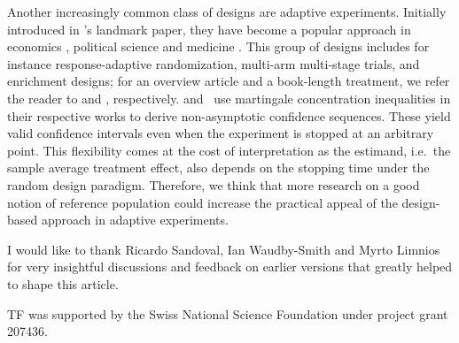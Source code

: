 \documentclass[aos]{imsart2}
\theoremstyle{plain}
\theoremstyle{definition}
\begin{document}
Another increasingly common class of designs are adaptive experiments. Initially introduced in \citet{thompson_likelihood_1933}'s landmark paper, they have become a popular approach in economics \citep{kasy_adaptive_2021}, political science \citep{offer-westort_adaptive_2021} and medicine \citep{burnett_adding_2020}. This group of designs includes for instance response-adaptive randomization, multi-arm multi-stage trials, and enrichment designs; for an overview article and a book-length treatment, we refer the reader to \citet{pallmann_adaptive_2018} and \citet{rosenberger_randomization_2015}, respectively. \citet{howard_time-uniform_2021} and~\citet{waudby-smith_estimating_2024} use martingale concentration inequalities in their respective works to derive non-asymptotic confidence sequences. These yield valid confidence intervals even when the experiment is stopped at an arbitrary point. This flexibility comes at the cost of interpretation as the estimand, i.e.\ the sample average treatment effect, also depends on the stopping time under the random design paradigm. Therefore, we think that more research on a good notion of reference population could increase the practical appeal of the design-based approach in adaptive experiments.


\begin{acks}[Acknowledgments]
I would like to thank Ricardo Sandoval, Ian Waudby-Smith and Myrto Limnios for very insightful discussions and feedback on earlier versions that greatly helped to shape this article.
\end{acks}

\begin{funding}
TF was supported by the Swiss National Science Foundation under project grant 207436.
\end{funding}

\end{document}
